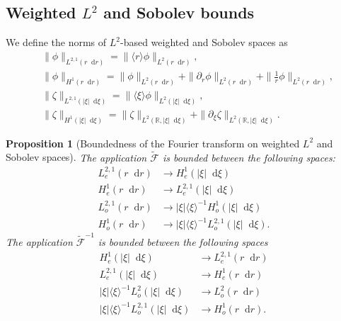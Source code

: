 \documentclass[11 pt]{amsart}
\newtheorem{prop}{Proposition}[section]
\theoremstyle{definition}
\theoremstyle{remark}
\numberwithin{equation}{section}
\newcommand{\dd}{\mathop{}\!\mathrm{d}}
\begin{document}
\subsection{Weighted $L^2$ and Sobolev bounds}
We define the norms of $L^2$-based weighted and Sobolev spaces as
\begin{align*}
& \| \phi\|_{L^{2,1}(r\dd r)}= \| \langle r \rangle \phi\|_{L^2(r\dd r)},\\
& \| \phi\|_{H^{1}(r\dd r)}= \| \phi \|_{L^2(r \dd r)} + \| \partial_r \phi \|_{L^2(r \dd r)}+\| \frac{1}{r}\phi \|_{L^2(r\dd r)},\\
& \| \zeta \|_{L^{2,1}(|\xi|\dd \xi)}= \| \langle \xi \rangle  \phi\|_{L^2(|\xi|\dd \xi)},\\
& \| \zeta \|_{H^{1}(|\xi|\dd \xi)}= \|  \zeta \|_{L^2(\mathbb R,|\xi| \dd \xi)}+\| \partial_\xi \zeta \|_{L^2(\mathbb R,|\xi| \dd \xi)}.
\end{align*}


\begin{prop}[Boundedness of the Fourier transform on weighted $L^2$ and Sobolev spaces]
The application $\widetilde{\mathcal F}$ is bounded between the following spaces: 
\begin{align*}
L^{2,1}_{e}(r\dd r)& \longrightarrow H^1_{e}(|\xi|\dd \xi) \\
H^{1}_{e}(r\dd r)&\longrightarrow L^{2,1}_{e}(|\xi|\dd \xi) \\
L^{2,1}_{o}(r\dd r)&\longrightarrow |\xi| \langle \xi \rangle^{-1} H^1_{o}(|\xi|\dd \xi) \\
H^{1}_{o}(r\dd r) &\longrightarrow |\xi| \langle \xi \rangle^{-1} L^{2,1}_{o}(|\xi|\dd \xi).
\end{align*}
The application $\widetilde{\mathcal F}^{-1}$ is bounded between the following spaces 
\begin{align*}
H^1_{e}(|\xi|\dd \xi) &\longrightarrow L^{2,1}_{e}(r\dd r) \\
L^{2,1}_{e}(|\xi|\dd \xi)  &\longrightarrow H^{1}_{e}(r\dd r) \\
|\xi| \langle \xi \rangle^{-1}L^2_{o}(|\xi|\dd \xi) &\longrightarrow L^2_{o}(r\dd r) \\
|\xi| \langle \xi \rangle^{-1} L^{2,1}_{o}(|\xi|\dd \xi) &\longrightarrow H^{1}_{o}(r\dd r).
\end{align*}
\end{prop}
\end{document}
